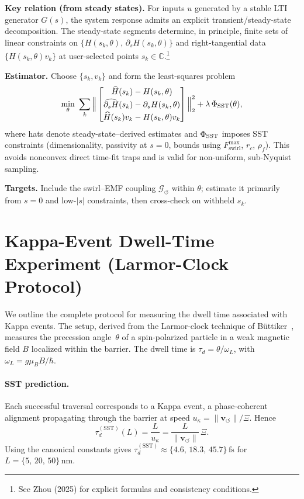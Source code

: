 \documentclass[10pt,reprint,aps,onecolumn,nofootinbib]{revtex4-2}
\newcommand{\rhof}{\rho_{\!f}}                           %
\newcommand{\rhoF}{\rhof}
\newcommand{\rc}{r_c}                                    %
\begin{document}
    \textbf{Key relation (from steady states).} For inputs $u$ generated by a stable LTI generator $G(s)$, the system response admits an explicit transient/steady-state decomposition. The steady-state segments determine, in principle, finite sets of linear constraints on $\{H(s_k,\theta),\, \partial_s H(s_k,\theta)\}$ and right-tangential data $\{H(s_k,\theta)v_k\}$ at user-selected points $s_k\in\mathbb{C}$.\footnote{See Zhou (2025) for explicit formulas and consistency conditions.}

    \textbf{Estimator.} Choose $\{s_k,v_k\}$ and form the least-squares problem
    \[
    \min_{\theta}\ \sum_k
    \Big\|
    \begin{bmatrix}
    \widehat{H}(s_k)-H(s_k,\theta)\\[2pt]
    \widehat{\partial_s H}(s_k)-\partial_s H(s_k,\theta)\\[2pt]
    \widehat{H}(s_k)v_k-H(s_k,\theta)v_k
    \end{bmatrix}
    \Big\|_2^2
    +\lambda\,\Phi_{\rm SST}(\theta),
    \]
    where hats denote steady-state–derived estimates and $\Phi_{\rm SST}$ imposes SST constraints (dimensionality, passivity at $s=0$, bounds using $F_{\text{swirl}}^{\max}$, $\rc$, $\rhoF$).
    This avoids nonconvex direct time-fit traps and is valid for non-uniform, sub-Nyquist sampling.

    \textbf{Targets.} Include the swirl–EMF coupling $\mathcal{G}_{\!\boldsymbol{\circlearrowleft}}$ within $\theta$; estimate it primarily from $s=0$ and low-$\lvert s\rvert$ constraints, then cross-check on withheld $s_k$.

\section{Kappa-Event Dwell-Time Experiment (Larmor-Clock Protocol)}
\label{app:KappaLarmor}

    We outline the complete protocol for measuring the dwell time associated with Kappa events. The setup, derived from the Larmor-clock technique of Büttiker~\cite{Buttiker1983}, measures the precession angle~$\theta$ of a spin-polarized particle in a weak magnetic field $B$ localized within the barrier. The dwell time is $\tau_d = \theta/\omega_L$, with $\omega_L = g\mu_B B/\hbar$.

    \paragraph{SST prediction.}
    Each successful traversal corresponds to a Kappa event, a phase-coherent alignment propagating through the barrier at speed $u_\kappa = \lVert\mathbf{v}_{\!\boldsymbol{\circlearrowleft}}\rVert/\Xi$. Hence
    \begin{equation}
    \tau^{(\mathrm{SST})}_d(L) = \frac{L}{u_\kappa} = \frac{L}{\lVert\mathbf{v}_{\!\boldsymbol{\circlearrowleft}}\rVert}\,\Xi .
    \end{equation}
    Using the canonical constants gives $\tau_d^{(\mathrm{SST})} \approx \{4.6,\,18.3,\,45.7\}\,\mathrm{fs}$ for $L = \{5,\,20,\,50\}\,\mathrm{nm}$.
\end{document}

